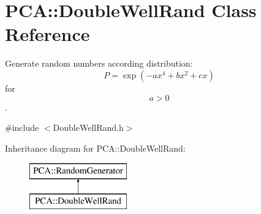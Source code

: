 \hypertarget{class_p_c_a_1_1_double_well_rand}{}\section{P\+CA\+:\+:Double\+Well\+Rand Class Reference}
\label{class_p_c_a_1_1_double_well_rand}


Generate random numbers according distribution\+: \[ P = \exp(-ax^4+bx^2+cx) \] for \[ a>0 \].  




{\ttfamily \#include $<$Double\+Well\+Rand.\+h$>$}

Inheritance diagram for P\+CA\+:\+:Double\+Well\+Rand\+:\begin{figure}[H]
\begin{center}
\leavevmode
\includegraphics[height=2.000000cm]{class_p_c_a_1_1_double_well_rand}
\end{center}
\end{figure}
